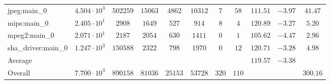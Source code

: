 \begin{tabular}{|l|c|c|c|c|c|c|c|c|c|c|}
jpeg:main\_0            & $ 4.504 \cdot 10^{3} $ & $ 502259 $ & $ 15063 $ & $ 4862  $ & $ 10312 $ & $ 7   $ & $ 58  $ & $ 111.51      $ & $ -3.97   $ & $ 41.47   $ \\
mips:main\_0            & $ 2.405 \cdot 10^{1} $ & $ 2908   $ & $ 1649  $ & $ 527   $ & $ 914   $ & $ 8   $ & $ 4   $ & $ 120.89      $ & $ -3.27   $ & $ 5.20    $ \\
mpeg2:main\_0           & $ 2.071 \cdot 10^{1} $ & $ 2187   $ & $ 2054  $ & $ 630   $ & $ 1411  $ & $ 0   $ & $ 1   $ & $ 105.62      $ & $ -4.47   $ & $ 2.96    $ \\
sha\_driver:main\_0     & $ 1.247 \cdot 10^{3} $ & $ 150588 $ & $ 2322  $ & $ 798   $ & $ 1970  $ & $ 0   $ & $ 12  $ & $ 120.71      $ & $ -3.28   $ & $ 4.98    $ \\
\hline
Average                 & $                    $ & $        $ & $       $ & $       $ & $       $ & $     $ & $     $ & $ 119.57      $ & $ -3.38   $ & $         $ \\
\hline
Overall                 & $ 7.700 \cdot 10^{3} $ & $ 890158 $ & $ 81036 $ & $ 25153 $ & $ 53728 $ & $ 320 $ & $ 110 $ & $             $ & $         $ & $ 300.16  $ \\
\hline
\end{tabular}
